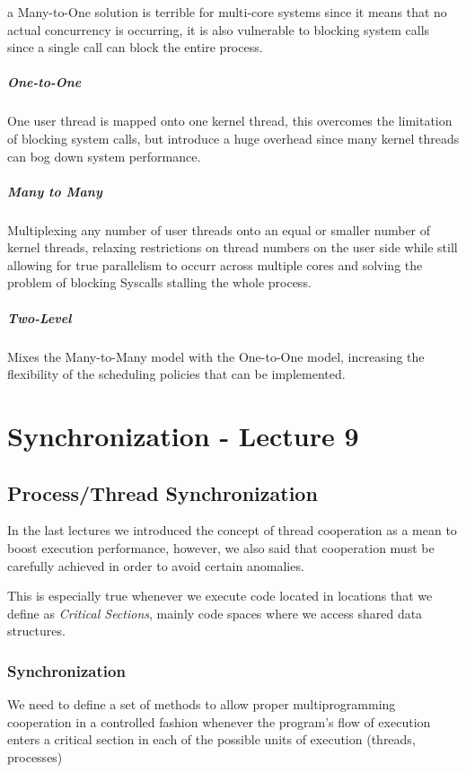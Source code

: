 \documentclass[openright, twoside]{report}
\theoremstyle{definition}
\theoremstyle{example}
\begin{document}
	a Many-to-One solution is terrible for multi-core systems since it means that 
	no actual concurrency is occurring, it is also vulnerable to blocking system calls since 
	a single call can block the entire process.

	\paragraph{One-to-One}
	One user thread is mapped onto one kernel thread, this overcomes the limitation of 
	blocking system calls, but introduce a huge overhead since many kernel threads can 
	bog down system performance.

	\paragraph{Many to Many}
	Multiplexing any number of user threads onto an equal or smaller number of kernel threads,
	relaxing restrictions on thread numbers on the user side while still allowing for true parallelism
	to occurr across multiple cores and solving the problem of blocking Syscalls stalling the whole process.

	\paragraph{Two-Level}
	Mixes the Many-to-Many model with the One-to-One model, increasing the flexibility of 
	the scheduling policies that can be implemented.

		
\chapter{Synchronization - Lecture 9}
	\section{Process/Thread Synchronization}
	In the last lectures we introduced the concept of thread cooperation as a mean 
	to boost execution performance, however, we also said that cooperation must be 
	carefully achieved in order to avoid certain anomalies.

	This is especially true whenever we execute code located in locations that we 
	define as \emph{Critical Sections}, mainly code spaces where we access 
	shared data structures.

		\subsection{Synchronization}
		We need to define a set of methods to allow proper multiprogramming cooperation 
		in a controlled fashion whenever the program's flow of execution enters a 
		critical section in each of the possible units of execution (threads, processes)
		
\end{document}
